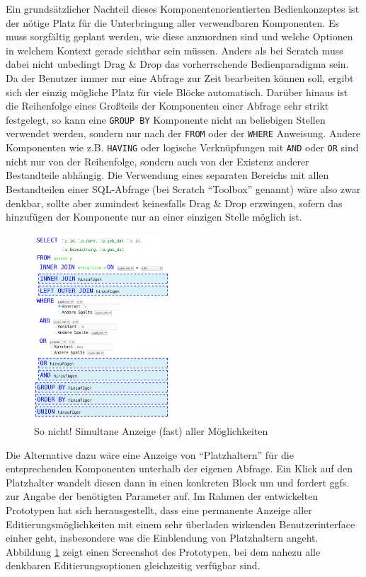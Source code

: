 \documentclass[paper=a4,fontsize=11pt,parskip=half]{scrartcl}
\begin{document}
Ein grundsätzlicher Nachteil dieses Komponentenorientierten Bedienkonzeptes ist der nötige Platz für die Unterbringung aller verwendbaren Komponenten. Es muss sorgfältig geplant werden, wie diese anzuordnen sind und welche Optionen in welchem Kontext gerade sichtbar sein müssen. Anders als bei Scratch muss dabei nicht unbedingt Drag \& Drop das vorherrschende Bedienparadigma sein. Da der Benutzer immer nur eine Abfrage zur Zeit bearbeiten können soll, ergibt sich der einzig mögliche Platz für viele Blöcke automatisch. Darüber hinaus ist die Reihenfolge eines Großteils der Komponenten einer Abfrage sehr strikt festgelegt, so kann eine \texttt{GROUP BY} Komponente nicht an beliebigen Stellen verwendet werden, sondern nur nach der \texttt{FROM} oder der \texttt{WHERE} Anweisung. Andere Komponenten wie z.B. \texttt{HAVING} oder logische Verknüpfungen mit \texttt{AND} oder \texttt{OR} sind nicht nur von der Reihenfolge, sondern auch von der Existenz anderer Bestandteile abhängig. Die Verwendung eines separaten Bereichs mit allen Bestandteilen einer SQL-Abfrage (bei Scratch ``Toolbox'' genannt) wäre also zwar denkbar, sollte aber zumindest keinesfalls Drag \& Drop erzwingen, sofern das hinzufügen der Komponente nur an einer einzigen Stelle möglich ist.

\begin{figure}
  \includegraphics[width=0.45\textwidth]{images/sql-sketch-all-editing}
  \caption{So nicht! Simultane Anzeige (fast) aller Möglichkeiten}
  \label{fig:screen-sql-editor-all-editing}
\end{figure}

Die Alternative dazu wäre eine Anzeige von ``Platzhaltern'' für die entsprechenden Komponenten unterhalb der eigenen Abfrage. Ein Klick auf den Platzhalter wandelt diesen dann in einen konkreten Block um und fordert ggfs. zur Angabe der benötigten Parameter auf. Im Rahmen der entwickelten Prototypen hat sich herausgestellt, dass eine permanente Anzeige aller Editierungsmöglichkeiten mit einem sehr überladen wirkenden Benutzerinterface einher geht, insbesondere was die Einblendung von Platzhaltern angeht. Abbildung \ref{fig:screen-sql-editor-all-editing} zeigt einen Screenshot des Prototypen, bei dem nahezu alle denkbaren Editierungsoptionen gleichzeitig verfügbar sind.
\end{document}
